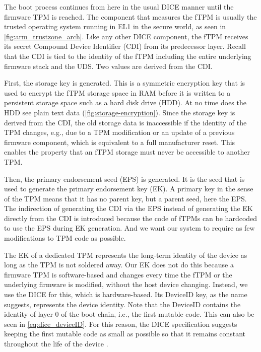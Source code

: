 The boot process continues from here in the usual DICE manner until the firmware TPM is reached.
The component that measures the fTPM is usually the trusted operating system running in EL1 in the secure world, as seen in \autoref{fig:arm_trustzone_arch}.
Like any other DICE component, the fTPM receives its secret Compound Device Identifier (CDI) from its predecessor layer.
Recall that the CDI is tied to the identity of the fTPM including the entire underlying firmware stack and the UDS.
Two values are derived from the CDI.


First, the storage key is generated.
This is a symmetric encryption key that is used to encrypt the fTPM storage space in RAM before it is written to a persistent storage space such as a hard disk drive (HDD).
At no time does the HDD see plain text data (\autoref{fig:storage-encryption}).
Since the storage key is derived from the CDI, the old storage data is inaccessible if the identity of the TPM changes, e.g., due to a TPM modification or an update of a previous firmware component, which is equivalent to a full manufacturer reset.
This enables the property that an fTPM storage must never be accessible to another TPM.




Then, the primary endorsement seed (EPS) is generated.
It is the seed that is used to generate the primary endorsement key (EK).
A primary key in the sense of the TPM means that it has no parent key, but a parent seed, here the EPS.
The indirection of generating the CDI via the EPS instead of generating the EK directly from the CDI is introduced because the code of fTPMs can be hardcoded to use the EPS during EK generation.
And we want our system to require as few modifications to TPM code as possible.


The EK of a dedicated TPM represents the long-term identity of the device as long as the TPM is not soldered away.
Our EK does not do this because a firmware TPM is software-based and changes every time the fTPM or the underlying firmware is modified, without the host device changing.
Instead, we use the DICE for this, which is hardware-based.
Its DeviceID key, as the name suggests, represents the device identity.
Note that the DeviceID contains the identity of layer 0 of the boot chain, i.e., the first mutable code.
This can also be seen in \autoref{eq:dice_deviceID}.
For this reason, the DICE specification suggests keeping the first mutable code as small as possible so that it remains constant throughout the life of the device \cite{dice-layering-arch}.

